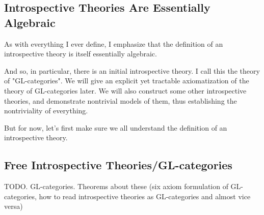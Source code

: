\subsection{Introspective Theories Are Essentially Algebraic}
As with everything I ever define, I emphasize that the definition of an introspective theory is itself essentially algebraic.

And so, in particular, there is an initial introspective theory. I call this the theory of "GL-categories". We will give an explicit yet tractable axiomatization of the theory of GL-categories later. We will also construct some other introspective theories, and demonstrate nontrivial models of them, thus establishing the nontriviality of everything.

But for now, let's first make sure we all understand the definition of an introspective theory.

\subsection{Free Introspective Theories/GL-categories}
TODO. GL-categories. Theorems about these (six axiom formulation of GL-categories, how to read introspective theories as GL-categories and almost vice versa)